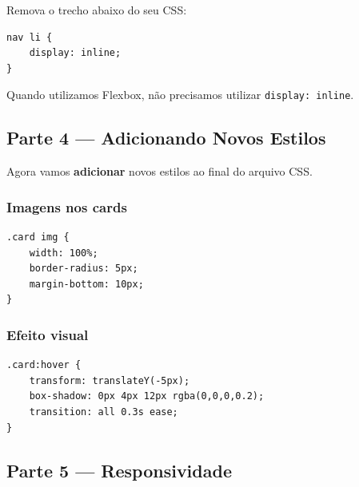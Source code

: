 \documentclass[12pt,a4paper]{article}
\begin{document}
Remova o trecho abaixo do seu CSS:

\begin{boxCodigo}
\begin{verbatim}
nav li {
    display: inline;
}
\end{verbatim}
\end{boxCodigo}

\begin{boxDica}
Quando utilizamos Flexbox, não precisamos utilizar \texttt{display: inline}.
\end{boxDica}


\subsection{Parte 4 — Adicionando Novos Estilos}

Agora vamos \textbf{adicionar} novos estilos ao final do arquivo CSS.

\subsubsection{Imagens nos cards}

\begin{boxCodigo}
\begin{verbatim}
.card img {
    width: 100%;
    border-radius: 5px;
    margin-bottom: 10px;
}
\end{verbatim}
\end{boxCodigo}

\subsubsection{Efeito visual}

\begin{boxCodigo}
\begin{verbatim}
.card:hover {
    transform: translateY(-5px);
    box-shadow: 0px 4px 12px rgba(0,0,0,0.2);
    transition: all 0.3s ease;
}
\end{verbatim}
\end{boxCodigo}


\subsection{Parte 5 — Responsividade}
\end{document}
